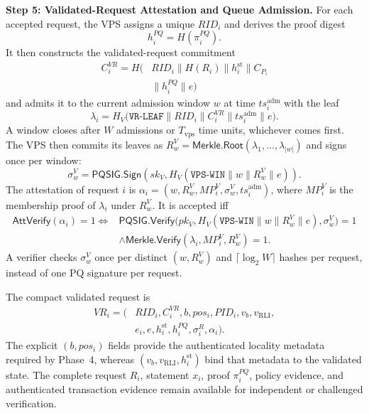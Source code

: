 \documentclass[lettersize,journal]{IEEEtran}
\begin{document}
\medskip
\noindent\textbf{Step 5: Validated-Request Attestation and Queue
Admission.}
For each accepted request, the VPS assigns a unique $RID_i$ and derives
the proof digest
\begin{equation}
h_i^{PQ}=H(\pi_i^{PQ}).
\end{equation}
It then constructs the validated-request commitment
\begin{equation}
\begin{aligned}
C_i^{VR}
=
H\big(&RID_i\parallel H(R_i)
\parallel h_i^{\mathrm{st}}
\parallel C_{P_i}\\
&\parallel h_i^{PQ}
\parallel e\big)
\end{aligned}
\end{equation}
\textcolor{e2}{and admits it to the current admission window $w$ at time
$ts_i^{\mathrm{adm}}$ with the leaf}
{\color{e2}\begin{equation}
\lambda_i=
H_V\big(\texttt{VR-LEAF}\parallel RID_i\parallel C_i^{VR}
\parallel ts_i^{\mathrm{adm}}\parallel e\big).
\end{equation}}
\textcolor{e2}{A window closes after $W$ admissions or $T_{\mathrm{vps}}$
time units, whichever comes first. The VPS then commits its leaves as
$R_w^{V}=\mathsf{Merkle.Root}(\lambda_1,\ldots,\lambda_{|w|})$ and
signs once per window:}
{\color{e2}\begin{equation}
\sigma_w^{V}=
\mathsf{PQSIG.Sign}
\left(
sk_V,
H_V(\texttt{VPS-WIN}\parallel w\parallel R_w^{V}\parallel e)
\right).
\end{equation}}
\textcolor{e2}{The attestation of request $i$ is
$\alpha_i=(w,R_w^{V},MP_i^{V},\sigma_w^{V},ts_i^{\mathrm{adm}})$,
where $MP_i^{V}$ is the membership proof of $\lambda_i$ under
$R_w^{V}$. It is accepted iff}
{\color{e2}\begin{equation}
\begin{aligned}
\mathsf{AttVerify}(\alpha_i)=1
\iff{}&
\mathsf{PQSIG.Verify}\big(pk_V,
H_V(\texttt{VPS-WIN}\parallel w\parallel R_w^{V}\parallel e),
\sigma_w^{V}\big)=1\\
&\land
\mathsf{Merkle.Verify}(\lambda_i,MP_i^{V},R_w^{V})=1.
\end{aligned}
\label{eq:attverify}
\end{equation}}
\textcolor{e2}{A verifier checks $\sigma_w^{V}$ once per distinct
$(w,R_w^{V})$ and $\lceil\log_2 W\rceil$ hashes per request, instead of
one PQ signature per request.}

The compact validated request is
\begin{equation}
\begin{aligned}
VR_i=\big(&RID_i,C_i^{VR},b,pos_i,PID_i,
v_b,v_{\mathrm{RLI}},\\
&e_i,e,h_i^{\mathrm{st}},h_i^{PQ},
\sigma_i^R,\alpha_i\big).
\end{aligned}
\end{equation}
The explicit $(b,pos_i)$ fields provide the authenticated locality
metadata required by Phase~4, whereas
$(v_b,v_{\mathrm{RLI}},h_i^{\mathrm{st}})$ bind that metadata to the
validated state. The complete request $R_i$, statement $x_i$, proof
$\pi_i^{PQ}$, policy evidence, and authenticated transaction evidence
remain available for independent or challenged verification.
\end{document}
